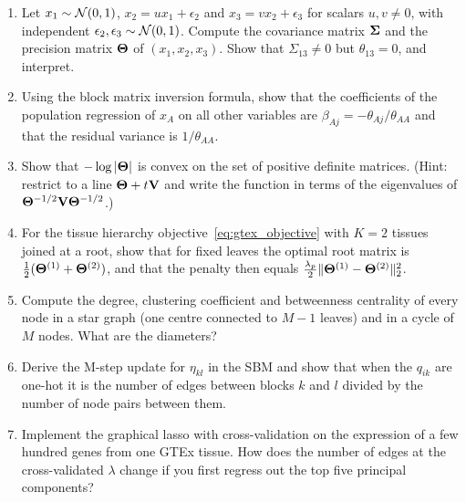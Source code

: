 \begin{enumerate}
  \item Let $x_1\sim\mathcal{N}(0,1)$, $x_2=ux_1+\epsilon_2$ and $x_3=vx_2+\epsilon_3$ for scalars $u,v\neq0$, with independent $\epsilon_2,\epsilon_3\sim\mathcal{N}(0,1)$. Compute the covariance matrix $\boldsymbol{\Sigma}$ and the precision matrix $\boldsymbol{\Theta}$ of $(x_1,x_2,x_3)$. Show that $\Sigma_{13}\neq0$ but $\theta_{13}=0$, and interpret.
  \item Using the block matrix inversion formula, show that the coefficients of the population regression of $x_A$ on all other variables are $\beta_{Aj}=-\theta_{Aj}/\theta_{AA}$ and that the residual variance is $1/\theta_{AA}$.
  \item Show that $-\log|\boldsymbol{\Theta}|$ is convex on the set of positive definite matrices. (Hint: restrict to a line $\boldsymbol{\Theta}+t\mathbf{V}$ and write the function in terms of the eigenvalues of $\boldsymbol{\Theta}^{-1/2}\mathbf{V}\boldsymbol{\Theta}^{-1/2}$.)
  \item For the tissue hierarchy objective~\eqref{eq:gtex_objective} with $K=2$ tissues joined at a root, show that for fixed leaves the optimal root matrix is $\frac12(\boldsymbol{\Theta}^{(1)}+\boldsymbol{\Theta}^{(2)})$, and that the penalty then equals $\frac{\lambda_p}{2}\|\boldsymbol{\Theta}^{(1)}-\boldsymbol{\Theta}^{(2)}\|_2^2$.
  \item Compute the degree, clustering coefficient and betweenness centrality of every node in a star graph (one centre connected to $M-1$ leaves) and in a cycle of $M$ nodes. What are the diameters?
  \item Derive the M-step update for $\eta_{kl}$ in the SBM and show that when the $q_{ik}$ are one-hot it is the number of edges between blocks $k$ and $l$ divided by the number of node pairs between them.
  \item Implement the graphical lasso with cross-validation on the expression of a few hundred genes from one GTEx tissue. How does the number of edges at the cross-validated $\lambda$ change if you first regress out the top five principal components?
\end{enumerate}
